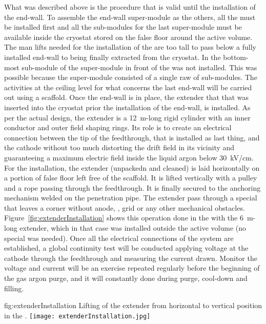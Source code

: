What was described above is the procedure that is valid until the installation of the  end-wall.
To assemble the end-wall super-module as the others, all the  must be installed first and all the sub-modules for the last super-module must be available inside the cryostat stored on the false floor around the active volume.
The man lifts needed for the installation of the  are too tall to pass below a fully installed end-wall to being finally extracted from the cryostat.
In  the bottom-most sub-module of the super-module in front of the  was not installed.
This was possible because the super-module consisted of a single raw of sub-modules.
The activities at the ceiling level for what concerns the last end-wall will be carried out using a scaffold.
Once the end-wall is in place, the  extender that that was inserted into the cryostat prior the installation of the end-wall,
is installed.
As per the actual design, the extender is a 12~m-long rigid cylinder with an inner conductor and outer field shaping rings.
Its role is to create an electrical connection between the tip of the feedthrough, that is installed as last thing, and the cathode without too much distorting the drift field in its vicinity and guaranteeing a maximum electric field inside the liquid argon below 30~kV/cm.
For the installation, the extender (unpackedn and cleaned) is laid horizontally on a portion of false floor left free of the scaffold.
It is lifted vertically with a pulley and a rope passing through the  feedthrough.
It is finally secured to the anchoring mechanism welded on the penetration pipe.
The extender pass through a special  that leaves a corner without anode, , grid or any other mechanical obstacles.
Figure~\ref{fig:extenderInstallation} shows this operation done in the  with the 6~m-long extender, which in that case was installed outside the active volume (no special  was needed).
Once all the electrical connections of the  system are established, a global continuity test will be conducted applying voltage at the cathode through the  feedthrough and measuring the current drawn.
Monitor the voltage and current will be an exercise repeated regularly before the beginning of the gas argon purge, and it will constantly done during purge, cool-down and filling. 
\begin{dunefigure}{fig:extenderInstallation}
{Lifting of the  extender from horizontal to vertical position in the .}
\texttt{[image: extenderInstallation.jpg]}
\end{dunefigure}



